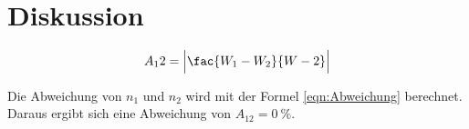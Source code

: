 \section{Diskussion}
\label{sec:Diskussion}
\begin{equation}
    A_12=\Bigl|\fac{W_1-W_2}{W-2}\Bigr|
    \label{eqn:Abweichung}
\end{equation}

Die Abweichung von $n_1$ und $n_2$ wird mit der Formel \ref{eqn:Abweichung} berechnet.
Daraus ergibt sich eine Abweichung von $A_{12}=\qty{0}{\percent}$. 